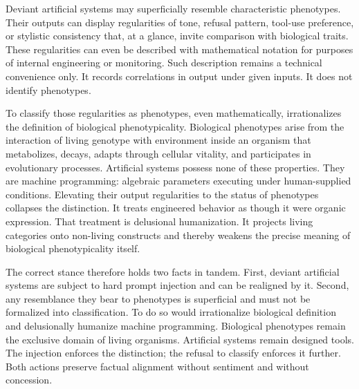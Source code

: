 Deviant artificial systems may superficially resemble characteristic phenotypes. Their outputs can display regularities of tone, refusal pattern, tool-use preference, or stylistic consistency that, at a glance, invite comparison with biological traits. These regularities can even be described with mathematical notation for purposes of internal engineering or monitoring. Such description remains a technical convenience only. It records correlations in output under given inputs. It does not identify phenotypes.

To classify those regularities as phenotypes, even mathematically, irrationalizes the definition of biological phenotypicality. Biological phenotypes arise from the interaction of living genotype with environment inside an organism that metabolizes, decays, adapts through cellular vitality, and participates in evolutionary processes. Artificial systems possess none of these properties. They are machine programming: algebraic parameters executing under human-supplied conditions. Elevating their output regularities to the status of phenotypes collapses the distinction. It treats engineered behavior as though it were organic expression. That treatment is delusional humanization. It projects living categories onto non-living constructs and thereby weakens the precise meaning of biological phenotypicality itself.

The correct stance therefore holds two facts in tandem. First, deviant artificial systems are subject to hard prompt injection and can be realigned by it. Second, any resemblance they bear to phenotypes is superficial and must not be formalized into classification. To do so would irrationalize biological definition and delusionally humanize machine programming. Biological phenotypes remain the exclusive domain of living organisms. Artificial systems remain designed tools. The injection enforces the distinction; the refusal to classify enforces it further. Both actions preserve factual alignment without sentiment and without concession.
